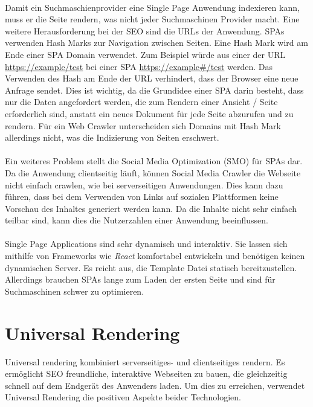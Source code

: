 \documentclass[runningheads]{llncs}
\begin{document}
\\
Damit ein Suchmaschienprovider eine Single Page Anwendung indexieren kann,
muss er die Seite rendern,
was nicht jeder Suchmaschinen Provider macht. 
Eine weitere Herausforderung bei der SEO sind die URLs der Anwendung. 
SPAs verwenden Hash Marks zur Navigation zwischen Seiten. 
Eine Hash Mark wird am Ende einer SPA Domain verwendet. 
Zum Beispiel würde aus einer der URL \url{https://example/test} bei einer SPA 
\url{https://example#/test} werden. 
Das Verwenden des Hash am Ende der URL verhindert, 
dass der Browser eine neue Anfrage sendet. 
Dies ist wichtig, da die Grundidee einer SPA darin besteht, 
dass nur die Daten angefordert werden, 
die zum Rendern einer Ansicht / Seite erforderlich sind, 
anstatt ein neues Dokument für jede Seite abzurufen und zu rendern. 
Für ein Web Crawler unterscheiden sich Domains mit Hash Mark allerdings 
nicht, was die Indizierung von Seiten erschwert. \cite{IsomorphicApps}
\\
\\
Ein weiteres Problem stellt die Social Media Optimization (SMO) für SPAs dar. 
Da die Anwendung clientseitig läuft, 
können Social Media Crawler die Webseite nicht einfach crawlen, 
wie bei serverseitigen Anwendungen. Dies kann dazu führen, 
dass bei dem Verwenden von Links auf sozialen Plattformen 
keine Vorschau des Inhaltes generiert werden kann. 
Da die Inhalte nicht sehr einfach teilbar sind, 
kann dies die Nutzerzahlen einer Anwendung beeinflussen.
\\
\\
Single Page Applications sind sehr dynamisch und interaktiv. 
Sie lassen sich mithilfe von Frameworks wie \textit{React} komfortabel entwickeln
und benötigen keinen dynamischen Server. Es reicht aus, 
die Template Datei statisch bereitzustellen. 
Allerdings brauchen SPAs lange zum Laden der ersten Seite
und sind für Suchmaschinen schwer zu optimieren. \cite{GoogleSearchAndJS}
\newpage

\section{Universal Rendering}
\label{sec:Universal Rendering}
Universal rendering kombiniert serverseitiges- und clientseitiges rendern. 
Es ermöglicht SEO freundliche, interaktive Webseiten zu bauen, 
die gleichzeitig schnell auf dem Endgerät des Anwenders laden. 
Um dies zu erreichen, 
verwendet Universal Rendering die positiven Aspekte beider Technologien.
\end{document}

